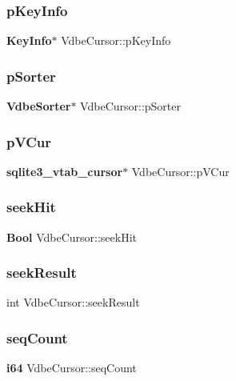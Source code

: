 \mbox{\label{struct_vdbe_cursor_a72a6c26ab2ab2ad699dfb45703ea4765}} 
\subsubsection{pKeyInfo}
{\footnotesize\ttfamily \textbf{ Key\+Info}$\ast$ Vdbe\+Cursor\+::p\+Key\+Info}

\mbox{\label{struct_vdbe_cursor_a7e9030a9f4ff8f8161a78dae28a1fe3b}} 
\subsubsection{pSorter}
{\footnotesize\ttfamily \textbf{ Vdbe\+Sorter}$\ast$ Vdbe\+Cursor\+::p\+Sorter}

\mbox{\label{struct_vdbe_cursor_a384e61f55a336779c6a60d6685f0a00e}} 
\subsubsection{pVCur}
{\footnotesize\ttfamily \textbf{ sqlite3\+\_\+vtab\+\_\+cursor}$\ast$ Vdbe\+Cursor\+::p\+V\+Cur}

\mbox{\label{struct_vdbe_cursor_ae83f9492b53f85ea5717bc3e80af943a}} 
\subsubsection{seekHit}
{\footnotesize\ttfamily \textbf{ Bool} Vdbe\+Cursor\+::seek\+Hit}

\mbox{\label{struct_vdbe_cursor_a5eff86e2a9c87dc15956ad362aa03f05}} 
\subsubsection{seekResult}
{\footnotesize\ttfamily int Vdbe\+Cursor\+::seek\+Result}

\mbox{\label{struct_vdbe_cursor_a4f11f0befb0dcf16273cc832ca6d92a5}} 
\subsubsection{seqCount}
{\footnotesize\ttfamily \textbf{ i64} Vdbe\+Cursor\+::seq\+Count}

